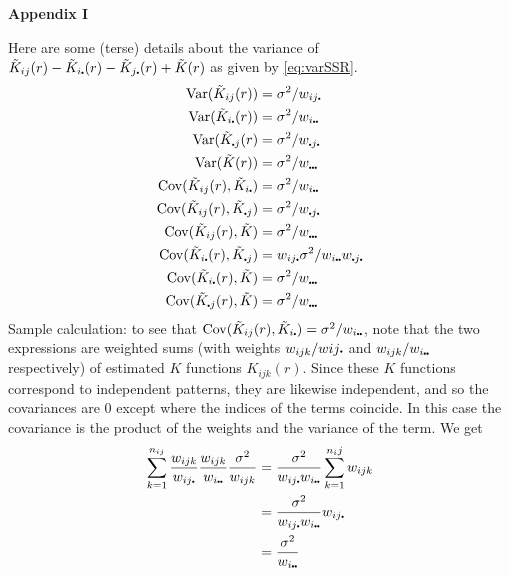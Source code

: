 \documentclass[12pt]{article}
\newcommand{\pullet}{\mbox{\scalebox{0.4}{$\bullet$}}}
\newcommand{\Cov}{\mbox{$\textup{\textrm{Cov}}$}}
\newcommand{\Var}{\mbox{$\textup{\textrm{Var}}$}}
\begin{document}



\newpage
\begin{center}
{\LARGE \textbf{Appendix I}}
\end{center}

Here are some (terse) details about the variance of
\mbox{$\tilde{K}_{ij}(r) - \tilde{K}_{i\pullet}(r) - \tilde{K}_{j
\pullet}(r) + \tilde{K}(r)$} as given by \eqref{eq:varSSR}.
\begin{align*}
\Var(\tilde{K}_{ij}(r)) &= \sigma^2/w_{i j \pullet} \\
\Var(\tilde{K}_{i\pullet}(r)) &= \sigma^2/w_{i \pullet \pullet} \\
\Var(\tilde{K}_{\pullet j}(r)  &= \sigma^2/w_{\pullet j \pullet} \\
\Var(\tilde{K}(r)) &= \sigma^2/w_{\pullet \pullet \pullet} \\
\Cov(\tilde{K}_{ij}(r),\tilde{K}_{i \pullet}) &= \sigma^2/w_{i \pullet \pullet} \\
\Cov(\tilde{K}_{ij}(r),\tilde{K}_{\pullet j}) &= \sigma^2/w_{\pullet j \pullet} \\
\Cov(\tilde{K}_{ij}(r),\tilde{K}) &= \sigma^2/w_{\pullet \pullet \pullet} \\
\Cov(\tilde{K}_{i \pullet}(r),\tilde{K}_{\pullet j}) &= w_{i j \pullet}
                \sigma^2/w_{i \pullet \pullet} w_{\pullet j \pullet} \\
\Cov(\tilde{K}_{i \pullet}(r),\tilde{K}) &= \sigma^2/w_{\pullet \pullet \pullet} \\
\Cov(\tilde{K}_{\pullet j}(r),\tilde{K}) &= \sigma^2/w_{\pullet \pullet \pullet}
\end{align*}
Sample calculation:  to see that $\Cov(\tilde{K}_{ij}(r),\tilde{K}_{i
\pullet}) = \sigma^2/w_{i \pullet \pullet}$, note that the two
expressions are weighted sums (with weights $w_{ijk}/w{ij\pullet}$
and $w_{ijk}/w_{i \pullet \pullet}$ respectively) of estimated $K$
functions $K_{ijk}(r)$.  Since these $K$ functions correspond to
independent patterns, they are likewise independent, and so the
covariances are 0 except where the indices of the terms coincide.
In this case the covariance is the product of the weights and the
variance of the term.  We get
\begin{align*}
\sum_{k=1}^{n_{ij}} \frac{w_{ijk}}{w_{ij\pullet}}
                    \frac{w_{ijk}}{w_{i \pullet \pullet}}
                    \frac{\sigma^2}{w_{ijk}}
&= \frac{\sigma^2}{w_{ij\pullet} w_{i \pullet \pullet}} \sum_{k=1}^{n_ij} w_{ijk} \\
&= \frac{\sigma^2}{w_{ij\pullet} w_{i \pullet \pullet}} w_{ij\pullet} \\
&= \frac{\sigma^2}{w_{i \pullet \pullet}}
\end{align*}
\end{document}
